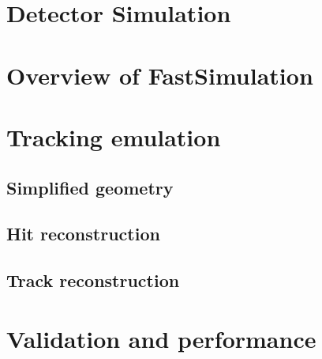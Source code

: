 
\section{Detector Simulation}

\section{Overview of FastSimulation}

\section{Tracking emulation}

\subsection{Simplified geometry}

\subsection{Hit reconstruction}

\subsection{Track reconstruction}

\section{Validation and performance}
